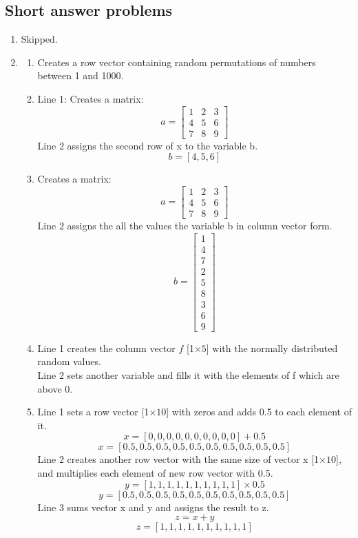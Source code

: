 \documentclass[man]{apa6}
\begin{document}
\subsection{Short answer problems}
	\begin{enumerate}
		\item Skipped.
		
		\item 
			\begin{enumerate}
				\item Creates a row vector containing random permutations of numbers between 1 and 1000.
				
				\item Line 1: Creates a matrix: \\
					\[ a= \left[ \begin{array}{ccc}
					1 & 2 & 3 \\
					4 & 5 & 6 \\
					7 & 8 & 9 \end{array} \right]\] 
					Line 2 assigns the second row of x to the variable b.
					$$b = [4,5,6]$$

				\item Creates a matrix: \\
					\[ a= \left[ \begin{array}{ccc}
					1 & 2 & 3 \\
					4 & 5 & 6 \\
					7 & 8 & 9 \end{array} \right]\] 
					Line 2 assigns the all the values the variable b in column vector form.
					\[ b= \left[ \begin{array}{c}
					1 \\ 4 \\ 7 \\
					2 \\ 5 \\ 8 \\
					3 \\ 6 \\ 9 \end{array} \right]\] 

				\item Line 1 creates the column vector $f$ [1$\times5$] with the normally distributed random values. \\
					Line 2 sets another variable and fills it with the elements of f which are above 0.

				\item Line 1 sets a row vector  [1$\times10$] with zeros and adds 0.5 to each element of it.
					$$x = [0, 0, 0, 0, 0 ,0 , 0, 0, 0, 0] + 0.5$$
					$$x= [0.5, 0.5, 0.5, 0.5, 0.5, 0.5, 0.5, 0.5, 0.5, 0.5]$$
					Line 2 creates another row vector with the same size of vector x [1$\times10$], and multiplies each element of new row vector with 0.5. \\
					$$y = [1, 1, 1, 1, 1 , 1, 1, 1, 1, 1] \times 0.5$$
					$$y= [0.5, 0.5, 0.5, 0.5, 0.5, 0.5, 0.5, 0.5, 0.5, 0.5]$$
					Line 3 sums vector x and y and assigns the result to z.
					$$z = x + y$$
					$$z= [1, 1, 1, 1, 1, 1, 1, 1, 1, 1]$$
					

\end{enumerate}
\end{enumerate}
\end{document}
